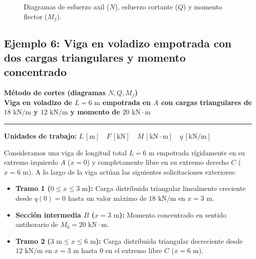 \begin{figure}[H]
{%
    }
    \caption{Diagramas de esfuerzo axil ($N$), esfuerzo cortante ($Q$) y momento flector ($M_f$).}
    \label{fig:ejemplo5_diagramas}
\end{figure}


\subsection{Ejemplo 6: Viga en voladizo empotrada con dos cargas triangulares y momento concentrado}

\begin{tcolorbox}[colback=blue!3!white, colframe=blue!40!black, arc=3pt, boxrule=0.8pt, left=8pt, right=8pt, top=6pt, bottom=6pt]
    \centering
    {\Large\bfseries\color{blue!60!black} Método de cortes (diagramas $N, Q, M_f$)}\\[2pt]
    {\normalsize\bfseries Viga en voladizo de $L = 6\text{ m}$ empotrada en $A$ con cargas triangulares de $18\text{ kN/m}$ y $12\text{ kN/m}$ y momento de $20\text{ kN}\cdot\text{m}$}

    \vspace{4pt}\hrule\vspace{4pt}
    {\small\textbf{Unidades de trabajo:} $L\,[\text{m}] \quad F\,[\text{kN}] \quad M\,[\text{kN}\cdot\text{m}] \quad q\,[\text{kN/m}]$}
\end{tcolorbox}


Consideramos una viga de longitud total $L = 6\text{ m}$ empotrada rígidamente en su extremo izquierdo $A$ ($x = 0$) y completamente libre en su extremo derecho $C$ ($x = 6\text{ m}$). A lo largo de la viga actúan las siguientes solicitaciones exteriores:
\begin{itemize}
    \item \textbf{Tramo 1 ($0 \le x \le 3\text{ m}$):} Carga distribuida triangular linealmente creciente desde $q(0) = 0$ hasta un valor máximo de $18\text{ kN/m}$ en $x = 3\text{ m}$.
    \item \textbf{Sección intermedia $B$ ($x = 3\text{ m}$):} Momento concentrado en sentido antihorario de $M_0 = 20\text{ kN}\cdot\text{m}$.
    \item \textbf{Tramo 2 ($3\text{ m} \le x \le 6\text{ m}$):} Carga distribuida triangular decreciente desde $12\text{ kN/m}$ en $x = 3\text{ m}$ hasta $0$ en el extremo libre $C$ ($x = 6\text{ m}$).
\end{itemize}

